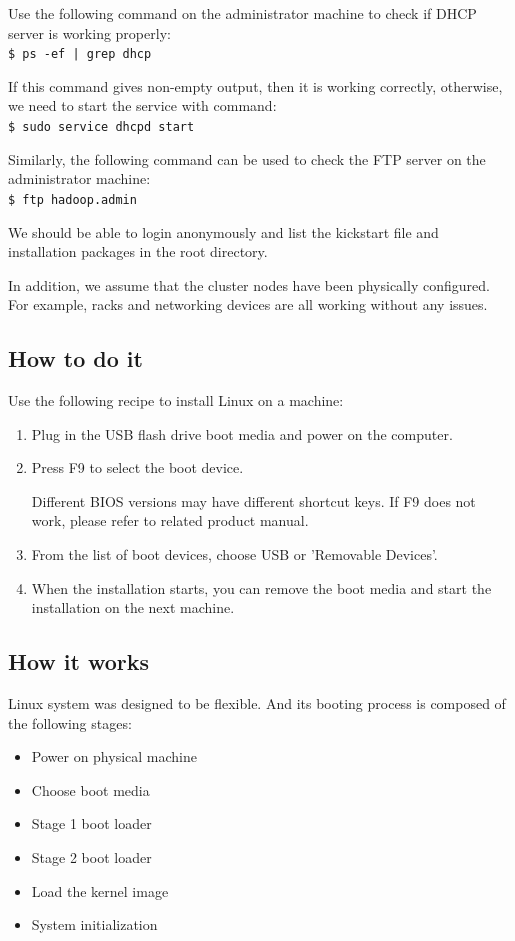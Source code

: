 Use the following command on the administrator machine to check if DHCP server is working properly:\\
\verb+$ ps -ef | grep dhcp+

If this command gives non-empty output, then it is working correctly, otherwise, we need to start the service with command: \\
\verb|$ sudo service dhcpd start|

Similarly, the following command can be used to check the FTP server on the administrator machine: \\
\verb|$ ftp hadoop.admin|

We should be able to login anonymously and list the kickstart file and installation packages in the root directory.

In addition, we assume that the cluster nodes have been physically configured. For example, racks and networking devices are all working without any issues.

\subsection*{How to do it}
Use the following recipe to install Linux on a machine:
\begin{enumerate}
  \item Plug in the USB flash drive boot media and power on the computer.
  \item Press F9 to select the boot device. \begin{warning} Different BIOS versions may have different shortcut keys. If F9 does not work, please refer to related product manual. \end{warning}
  \item From the list of boot devices, choose USB or 'Removable Devices'.
  \item When the installation starts, you can remove the boot media and start the installation on the next machine.
\end{enumerate}
\subsection*{How it works}
Linux system was designed to be flexible. And its booting process is composed of the following stages:
\begin{itemize}
  \item Power on physical machine
  \item Choose boot media
  \item Stage 1 boot loader
  \item Stage 2 boot loader
  \item Load the kernel image
  \item System initialization
\end{itemize}

